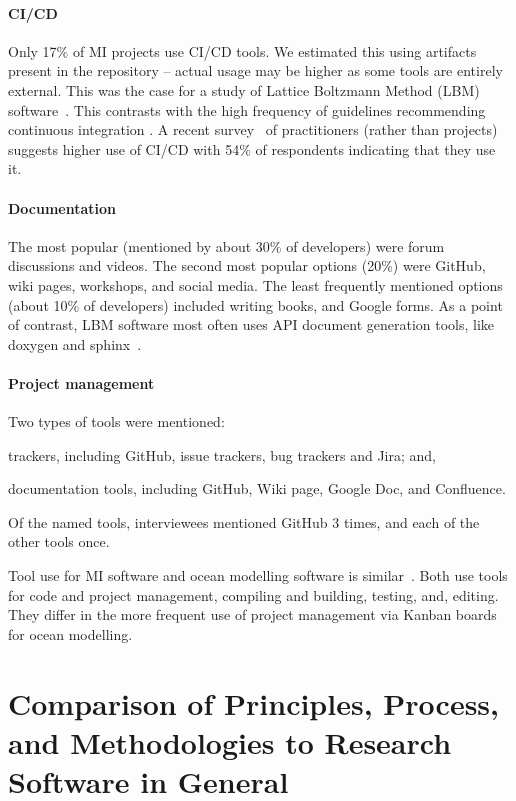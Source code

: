 \documentclass[draft, 12pt, 3p, times]{elsarticle} %
\begin{document}
\paragraph{CI/CD} Only 17\% of MI projects use CI/CD tools. We estimated this
using artifacts present in the repository -- actual usage may be higher as some
tools are entirely external. This was the case for a study of Lattice Boltzmann
Method (LBM) software~\cite{Michalski2021}.  This contrasts with the high
frequency of guidelines recommending continuous integration \cite{BrettEtAl2021,
ThielEtAl2020, vanGompelEtAl2016, Brown2015, Zadka2018}.  A recent
survey~\cite{CarverEtAl2022} of practitioners (rather than projects) suggests
higher use of CI/CD with 54\% of respondents indicating that they use it.

\paragraph{Documentation} The most popular (mentioned by about 30\% of
developers) were forum discussions and videos.  The second most popular options
(20\%) were GitHub, wiki pages, workshops, and social media. The least
frequently mentioned options (about 10\% of developers) included writing books,
and Google forms.  As a point of contrast, LBM software most often uses API
document generation tools, like doxygen and sphinx~\cite{Michalski2021}.

\paragraph{Project management} Two types of tools were mentioned:
\begin{inparaenum}[i)]
\item trackers, including GitHub, issue trackers, bug trackers and Jira; and,
\item documentation tools, including GitHub, Wiki page, Google Doc, and
Confluence.
\end{inparaenum}
Of the named tools, interviewees mentioned GitHub 3 times, and each
of the other tools once.

Tool use for MI software and ocean modelling software is
similar~\cite{JungEtAl2022}.  Both use tools for code and project management,
compiling and building, testing, and, editing. They differ in the more frequent
use of project management via Kanban boards for ocean modelling.

\section[Comparison to Other Research Software]{Comparison of Principles, Process, and
Methodologies to Research Software in General} \label{Sec_CompareMethodologies}
\end{document}
